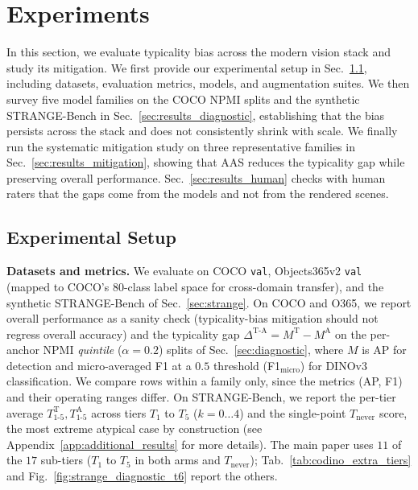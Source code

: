 \section{Experiments}
\label{sec:experiments}
\vspace{-5.0pt}
In this section, we evaluate typicality bias across the modern vision stack and study its mitigation. We first provide our experimental setup in Sec.~\ref{sec:experimental_setup}, including datasets, evaluation metrics, models, and augmentation suites. We then survey five model families on the COCO NPMI splits and the synthetic STRANGE-Bench in Sec.~\ref{sec:results_diagnostic}, establishing that the bias persists across the stack and does not consistently shrink with scale. We finally run the systematic mitigation study on three representative families in Sec.~\ref{sec:results_mitigation}, showing that AAS reduces the typicality gap while preserving overall performance. Sec.~\ref{sec:results_human} checks with human raters that the gaps come from the models and not from the rendered scenes.

\subsection{Experimental Setup}
\label{sec:experimental_setup}

\noindent\textbf{Datasets and metrics.}
We evaluate on COCO \texttt{val}, Objects365v2 \texttt{val}~\cite{shao2019objects365} (mapped to COCO's 80-class label space for cross-domain transfer), and the synthetic STRANGE-Bench of Sec.~\ref{sec:strange}. On COCO and O365, we report overall performance as a sanity check (typicality-bias mitigation should not regress overall accuracy) and the typicality gap $\Delta^{\text{T-A}} = M^{\text{T}} - M^{\text{A}}$ on the per-anchor NPMI \emph{quintile} ($\alpha = 0.2$) splits of Sec.~\ref{sec:diagnostic}, where $M$ is AP for detection and micro-averaged F1 at a $0.5$ threshold (F1$_{\text{micro}}$) for DINOv3 classification. We compare rows within a family only, since the metrics (AP, F1) and their operating ranges differ. On STRANGE-Bench, we report the per-tier average $T_{1\text{-}5}^{\text{T}}, T_{1\text{-}5}^{\text{A}}$ across tiers $T_1$ to $T_5$ ($k = 0 \dots 4$) and the single-point $T_{\text{never}}$ score, the most extreme atypical case by construction (see Appendix~\ref{app:additional_results} for more details). The main paper uses $11$ of the $17$ sub-tiers ($T_1$ to $T_5$ in both arms and $T_{\text{never}}$); Tab.~\ref{tab:codino_extra_tiers} and Fig.~\ref{fig:strange_diagnostic_t6} report the others.

